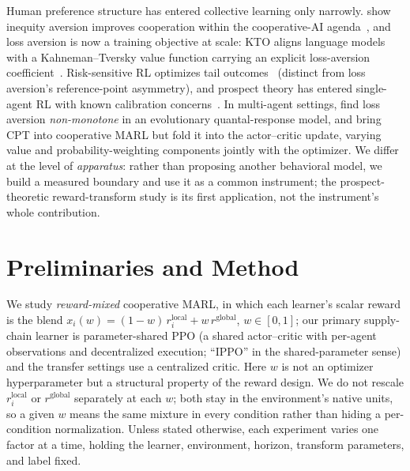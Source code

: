 \documentclass[letterpaper]{article} %
\theoremstyle{plain}
\begin{document}
Human preference structure has entered collective learning only narrowly.
\citet{hughes2018inequity} show inequity aversion improves cooperation within the cooperative-AI
agenda~\citep{dafoe2020open,hammond2025multiagent,barfuss2020caring}, and loss aversion is now a
training objective at scale: KTO aligns language models with a Kahneman--Tversky value function
carrying an explicit loss-aversion coefficient~\citep{ethayarajh2024kto}. Risk-sensitive RL optimizes
tail outcomes~\citep{qiu2021rmix,xie2023riskq,prashanth2014cvar,tamar2015optimizing} (distinct from
loss aversion's reference-point asymmetry), and prospect theory has entered single-agent RL with known
calibration concerns~\citep{prashanth2016cumulative,rabin2000risk,tversky1992}. In multi-agent settings,
\citet{mengesha2025} find loss aversion \emph{non-monotone} in an evolutionary quantal-response model,
and \citet{lalmohammed2025} bring CPT into cooperative MARL but fold it into the actor--critic update,
varying value and probability-weighting components jointly with the optimizer. We differ at the level of \emph{apparatus}: rather than proposing
another behavioral model, we build a measured boundary and use it as a common instrument; the
prospect-theoretic reward-transform study is its first application, not the instrument's whole
contribution.

\section{Preliminaries and Method}
\label{sec:method}

We study \emph{reward-mixed} cooperative MARL, in which each learner's scalar reward is the blend
$x_i(w)=(1-w)\,r_i^{\mathrm{local}}+w\,r^{\mathrm{global}}$, $w\in[0,1]$; our primary supply-chain
learner is parameter-shared PPO (a shared actor--critic with per-agent observations and
decentralized execution; ``IPPO'' in the shared-parameter sense) and the transfer settings use a
centralized critic. Here $w$ is not an
optimizer hyperparameter but a structural property of the reward design. We do not rescale
$r_i^{\mathrm{local}}$ or $r^{\mathrm{global}}$ separately at each $w$; both stay in the
environment's native units, so a given $w$ means the same mixture in every condition rather than
hiding a per-condition normalization. Unless stated otherwise, each experiment varies one factor at
a time, holding the learner, environment, horizon, transform parameters, and label fixed.
\end{document}
